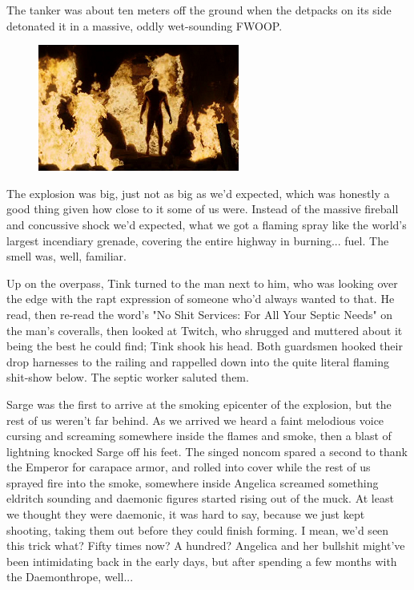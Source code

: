 The tanker was about ten meters off the ground when the detpacks on its side detonated it in a massive, oddly wet-sounding FWOOP.

\begin{figure}
	\begin{center}
		\includegraphics[width=\figwidth]{pics/19/43.png}
	\end{center}
\end{figure}
The explosion was big, just not as big as we'd expected, which was honestly a good thing given how close to it some of us were. 
Instead of the massive fireball and concussive shock we'd expected, what we got a flaming spray like the world's largest incendiary grenade, covering the entire highway in burning... 
fuel. 
The smell was, well, familiar.

Up on the overpass, Tink turned to the man next to him, who was looking over the edge with the rapt expression of someone who'd always wanted to that. 
He read, then re-read the word's "No Shit Services: 
For All Your Septic Needs" on the man's coveralls, then looked at Twitch, who shrugged and muttered about it being the best he could find; 
Tink shook his head. 
Both guardsmen hooked their drop harnesses to the railing and rappelled down into the quite literal flaming shit-show below. 
The septic worker saluted them.

Sarge was the first to arrive at the smoking epicenter of the explosion, but the rest of us weren't far behind. 
As we arrived we heard a faint melodious voice cursing and screaming somewhere inside the flames and smoke, then a blast of lightning knocked Sarge off his feet. 
The singed noncom spared a second to thank the Emperor for carapace armor, and rolled into cover while the rest of us sprayed fire into the smoke, somewhere inside Angelica screamed something eldritch sounding and daemonic figures started rising out of the muck. 
At least we thought they were daemonic, it was hard to say, because we just kept shooting, taking them out before they could finish forming. 
I mean, we'd seen this trick what? 
Fifty times now? 
A hundred? 
Angelica and her bullshit might've been intimidating back in the early days, but after spending a few months with the Daemonthrope, well... 


